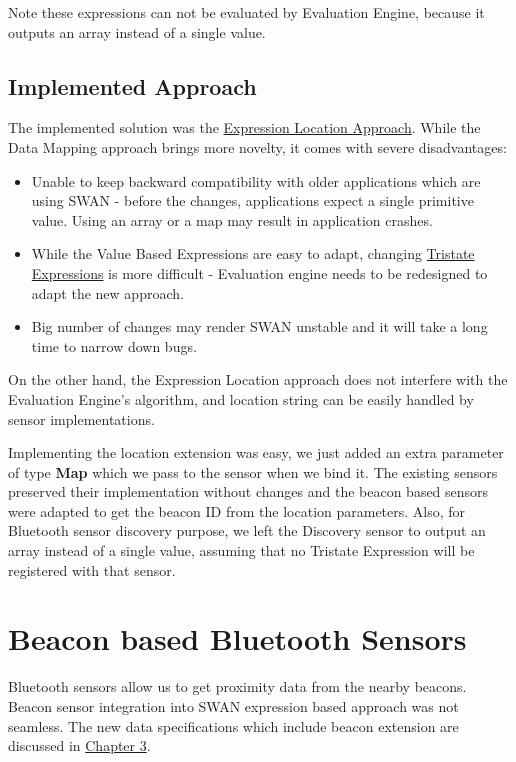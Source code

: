 Note these expressions can not be evaluated by Evaluation Engine, because it outputs an array instead of a single value.


\subsection{Implemented Approach}
The implemented solution was the \hyperref[sssec:exprlocation]{Expression Location Approach}.
While the Data Mapping approach brings more novelty, it comes with severe disadvantages:
\begin{itemize}
 \item Unable to keep backward compatibility with older applications which are using SWAN - before the changes, applications
 expect a single primitive value. Using an array or a map may result in application crashes.
 \item While the Value Based Expressions are easy to adapt, changing \hyperref[swan_song_expressions]{Tristate Expressions} is more difficult - Evaluation engine needs to be redesigned to adapt the new approach.
 \item Big number of changes may render SWAN unstable and it will take a long time to narrow down bugs.
\end{itemize}

On the other hand, the Expression Location approach does not interfere with the Evaluation Engine's algorithm, and location string can be easily 
handled by sensor implementations. 

Implementing the location extension was easy, we just added an extra parameter of type \textbf{Map} which we pass to the sensor
when we bind it.
The existing sensors preserved their implementation without changes and the beacon based sensors were adapted to get the beacon ID from the location parameters.
Also, for Bluetooth sensor discovery purpose, we left the Discovery sensor to output an array instead of a single value, assuming that no Tristate Expression will be registered with that 
sensor.

\section{Beacon based Bluetooth Sensors}

Bluetooth sensors allow us to get proximity data from the nearby beacons. Beacon sensor integration into SWAN expression based approach was not seamless.
The new data specifications which include beacon extension are discussed in \hyperref[Chapter3]{Chapter 3}.

